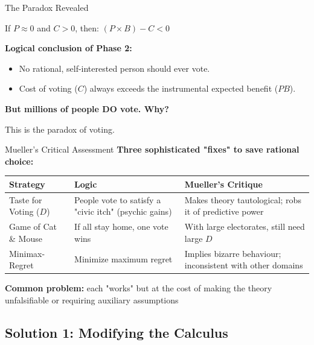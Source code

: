 \documentclass[10pt]{beamer}
\begin{document}
\begin{frame}{The Paradox Revealed}
\begin{alertblock}{If $P \approx 0$ and $C > 0$, then:}
\centering
\Large
$(P \times B) - C < 0$
\end{alertblock}


\textbf{Logical conclusion of Phase 2:}
\begin{itemize}
\item No rational, self-interested person should ever vote.
\item Cost of voting ($C$) always exceeds the instrumental expected benefit ($PB$).
\end{itemize}


\begin{exampleblock}{}
\centering
\textbf{But millions of people DO vote. Why?}
\end{exampleblock}


This is the paradox of voting.
\end{frame}

\begin{frame}{Mueller's Critical Assessment}
\textbf{Three sophisticated "fixes" to save rational choice:}


\begin{table}
\centering
\footnotesize
\begin{tabular}{p{2.5cm}p{3.5cm}p{3.5cm}}
\toprule
\textbf{Strategy} & \textbf{Logic} & \textbf{Mueller's Critique} \\
\midrule
Taste for Voting ($D$) & People vote to satisfy a "civic itch" (psychic gains) & Makes theory tautological; robs it of predictive power \\
\midrule
Game of Cat \& Mouse & If all stay home, one vote wins & With large electorates, still need large $D$ \\
\midrule
Minimax-Regret & Minimize maximum regret & Implies bizarre behaviour; inconsistent with other domains \\
\bottomrule
\end{tabular}
\end{table}


\textbf{Common problem:} each "works" but at the cost of making the theory unfalsifiable or requiring auxiliary assumptions
\end{frame}

\subsection{Solution 1: Modifying the Calculus}
\end{document}
